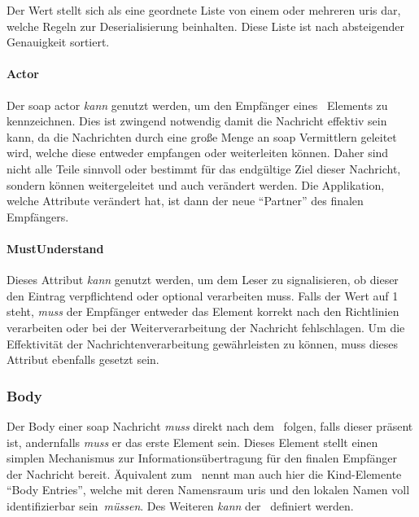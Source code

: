 			Der Wert stellt sich als eine geordnete Liste von einem oder mehreren \glspl{uri} dar,
			welche Regeln zur Deserialisierung beinhalten.
			Diese Liste ist nach absteigender Genauigkeit sortiert.

		\paragraph{Actor}\label{p:soapActor}
			Der \gls{soap} actor \textit{kann} genutzt werden,
			um den Empfänger eines~ Elements zu kennzeichnen.
			Dies ist zwingend notwendig damit die Nachricht effektiv sein kann,
			da die Nachrichten durch eine große Menge an \gls{soap} Vermittlern geleitet wird,
			welche diese entweder empfangen oder weiterleiten können.
			Daher sind nicht alle Teile sinnvoll oder bestimmt für das endgültige Ziel dieser Nachricht,
			sondern können weitergeleitet und auch verändert werden.
			Die Applikation, welche Attribute verändert hat,
			ist dann der neue \enquote{Partner} des finalen Empfängers.

		\paragraph{MustUnderstand}\label{p:soapMustUnderstand}
			Dieses Attribut \textit{kann} genutzt werden,
			um dem Leser zu signalisieren,
			ob dieser den Eintrag verpflichtend oder optional verarbeiten muss.
			Falls der Wert auf 1 steht,
			\textit{muss} der Empfänger entweder das Element korrekt nach den Richtlinien verarbeiten
			oder bei der Weiterverarbeitung der Nachricht fehlschlagen.
			Um die Effektivität der Nachrichtenverarbeitung gewährleisten zu können,
			muss dieses Attribut ebenfalls gesetzt sein.

	\subsubsection{Body}\label{subsubsec:soapBody}
		Der Body einer \gls{soap} Nachricht \textit{muss} direkt nach dem~ folgen,
		falls dieser präsent ist,
		andernfalls \textit{muss} er das erste Element sein.
		Dieses Element stellt einen simplen Mechanismus zur Informationsübertragung für den finalen Empfänger der Nachricht bereit.
		Äquivalent zum~ nennt man auch hier die Kind-Elemente \enquote{Body Entries},
		welche mit deren Namensraum \glspl{uri} und den lokalen Namen voll identifizierbar sein~\textit{müssen}.
		Des Weiteren \textit{kann} der~ definiert werden.